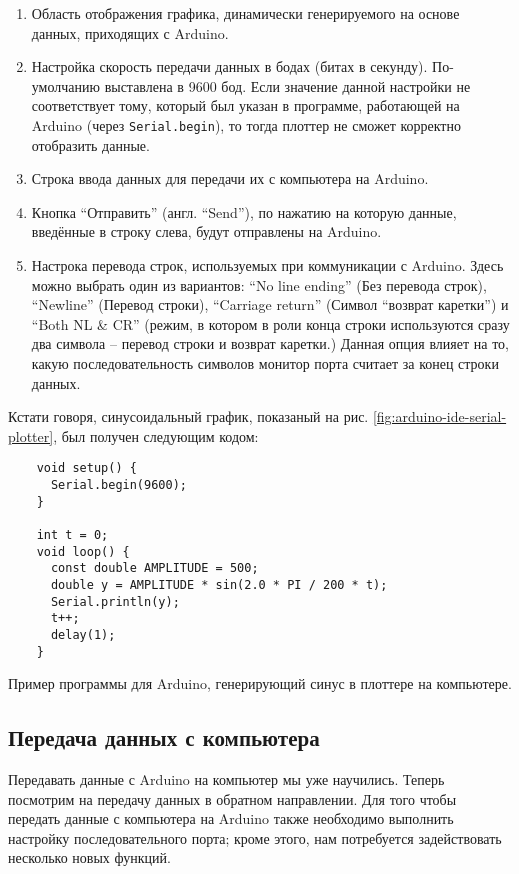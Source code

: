 \documentclass[../sparc.tex]{subfiles}
\begin{document}
\begin{enumerate}
\item Область отображения графика, динамически генерируемого на основе данных,
  приходящих с Arduino.
\item Настройка скорость передачи данных в бодах (битах в секунду).
  По-умолчанию выставлена в 9600 бод.  Если значение данной настройки не
  соответствует тому, который был указан в программе, работающей на Arduino
  (через \texttt{Serial.begin}), то тогда плоттер не сможет корректно отобразить
  данные.
\item Строка ввода данных для передачи их с компьютера на Arduino.
\item Кнопка ``Отправить'' (англ. ``Send''), по нажатию на которую данные,
  введённые в строку слева, будут отправлены на Arduino.
\item Настрока перевода строк, используемых при коммуникации с Arduino.  Здесь
  можно выбрать один из вариантов: ``No line ending'' (Без перевода строк),
  ``Newline'' (Перевод строки), ``Carriage return'' (Символ ``возврат каретки'')
  и ``Both NL \& CR'' (режим, в котором в роли конца строки используются сразу
  два символа -- перевод строки и возврат каретки.)  Данная опция влияет на то,
  какую последовательность символов монитор порта считает за конец строки
  данных.
\end{enumerate}

\newpage

Кстати говоря, синусоидальный график, показаный на
рис. \ref{fig:arduino-ide-serial-plotter}, был получен следующим кодом:

\begin{listing}[ht]
  \begin{verbatim}
    void setup() {
      Serial.begin(9600);
    }

    int t = 0;
    void loop() {
      const double AMPLITUDE = 500;
      double y = AMPLITUDE * sin(2.0 * PI / 200 * t);
      Serial.println(y);
      t++;
      delay(1);
    }
  \end{verbatim}
  \label{listing:serial-port-sine-wave-example}
  \caption{Пример программы для Arduino, генерирующий синус в плоттере на
    компьютере.}
\end{listing}

\subsection{Передача данных с компьютера}

Передавать данные с Arduino на компьютер мы уже научились. Теперь посмотрим на
передачу данных в обратном направлении.  Для того чтобы передать данные с
компьютера на Arduino также необходимо выполнить настройку последовательного
порта; кроме этого, нам потребуется задействовать несколько новых функций.
\end{document}
